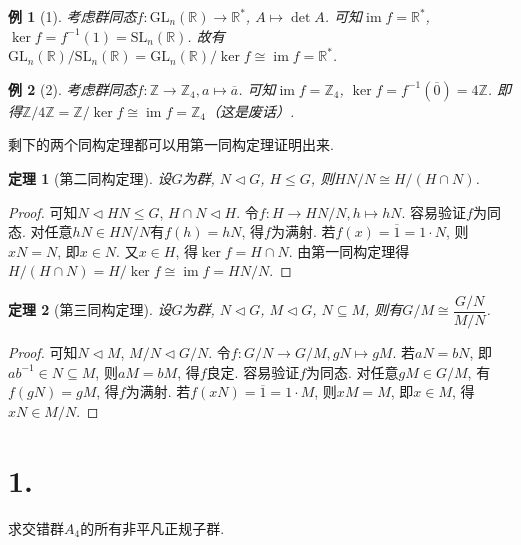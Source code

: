 \documentclass[12pt, a4paper, fontset=windows]{ctexart}
\newcommand{\R}{\mathbb{R}}
\newcommand{\Z}{\mathbb{Z}}
\newcommand{\GL}{\mathrm{GL}}
\newcommand{\SL}{\mathrm{SL}}
\newcommand{\cl}[1]{\overline{#1}} %
\newcommand{\im}{\operatorname{im}}
\newcommand{\isom}{\cong} %
\newcommand{\kh}[1]{（{#1}）} %
\newtheorem*{example}{例}
\newtheorem*{theorem}{定理}
\begin{document}
\begin{example}[1]
考虑群同态$f:\GL_n(\R)\to\R^*$, $A\mapsto\det A$. 
可知$\im f=\R^*$, $\ker f=f^{-1}(1)=\SL_n(\R)$. 
故有$\GL_n(\R)/\SL_n(\R)=\GL_n(\R)/\ker f\isom\im f=\R^*$. 
\end{example}

\begin{example}[2]
考虑群同态$f:\Z\to\Z_4,a\mapsto\cl{a}$. 可知$\im f=\Z_4$, 
$\ker f=f^{-1}(\cl{0})=4\Z$. 即得$\Z/4\Z=\Z/\ker f\isom\im f=\Z_4$\kh{这是废话}. 
\end{example}

剩下的两个同构定理都可以用第一同构定理证明出来. 

\begin{theorem}[第二同构定理]
设$G$为群, $N\lhd G$, $H\le G$, 则$HN/N\isom H/(H\cap N)$. 
\end{theorem}

\begin{proof}
可知$N\lhd HN\le G$, $H\cap N\lhd H$. 
令$f:H\to HN/N,h\mapsto hN$. 容易验证$f$为同态. 
对任意$hN\in HN/N$有$f(h)=hN$, 得$f$为满射. 
若$f(x)=\cl{1}=1\cdot N$, 则$xN=N$, 即$x\in N$. 
又$x\in H$, 得$\ker f=H\cap N$. 由第一同构定理得
$H/(H\cap N)=H/\ker f\isom\im f=HN/N$. 
\end{proof}

\begin{theorem}[第三同构定理]
\label{3rd-iso-thm}
设$G$为群, $N\lhd G$, $M\lhd G$, $N\subseteq M$, 
则有$G/M\isom\dfrac{G/N}{M/N}$. 
\end{theorem}

\begin{proof}
可知$N\lhd M$, $M/N\lhd G/N$. 
令$f:G/N\to G/M,gN\mapsto gM$. 若$aN=bN$, 即
$ab^{-1}\in N\subseteq M$, 则$aM=bM$, 得$f$良定. 
容易验证$f$为同态. 
对任意$gM\in G/M$, 有$f(gN)=gM$, 得$f$为满射. 
若$f(xN)=\cl{1}=1\cdot M$, 则$xM=M$, 即$x\in M$, 
得$xN\in M/N$. 
\end{proof}

\section*{1.}

求交错群$A_4$的所有非平凡正规子群. 
\label{A4-lhd}
\end{document}
